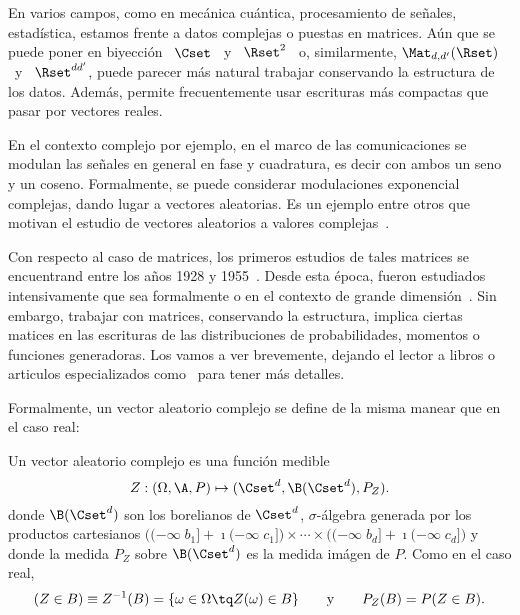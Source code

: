 \label{Sec:MP:VectoresComplejosMatricesAleatorias}

En  varios campos, como  en mec\'anica  cu\'antica, procesamiento  de se\~nales,
estad\'istica, estamos frente a datos complejas o puestas en matrices. A\'un que
se  puede poner en  biyecci\'on \  $\Cset$ \  y \  $\Rset^2$ \  o, similarmente,
$\Mat_{d,d'}(\Rset)$ \  y \ $\Rset^{d  d'}$, puede parecer m\'as  natural trabajar
conservando la  estructura de los  datos. Adem\'as, permite  frecuentemente usar
escrituras m\'as compactas que pasar por vectores reales.

En  el contexto  complejo por  ejemplo,  en el  marco de  las comunicaciones  se
modulan las  se\~nales en general  en fase y  cuadratura, es decir con  ambos un
seno  y un coseno.   Formalmente, se  puede considerar  modulaciones exponencial
complejas, dando  lugar a  vectores aleatorias.  Es  un ejemplo entre  otros que
motivan  el  estudio de  vectores  aleatorios  a valores  complejas~\cite{Lap17,
  SchSch03, EriKoi06, EriOll09, AmbGae96, Par18}.

Con respecto  al caso  de matrices,  los primeros estudios  de tales  matrices se
encuentrand entre  los a\~nos 1928 y 1955~\cite{Wis28,  NeuGol47, Wig55}.  Desde
esta  \'epoca, fueron  estudiados intensivamente  que  sea formalmente  o en  el
contexto de grande dimensi\'on~\cite{MarPas67, BouPas95}.  Sin embargo, trabajar
con  matrices, \ie  conservando la  estructura, implica  ciertas matices  en las
escrituras  de  las  distribuciones  de  probabilidades,  momentos  o  funciones
generadoras.  Los vamos a ver brevemente, dejando el lector a libros o articulos
especializados  como~\cite{AkeBai15,  GupNag99,  AndGui10,  LivNov18,  EdeRao05,
  Meh04, Car83, Daw81, MezSna08, TulVer04} para tener m\'as detalles.
%
%


\label{Ssec:MP:VAComplejos}

Formalmente, un vector aleatorio complejo se define de la misma manear que en el
caso real:
%
\begin{definicion}
\label{Def:MP:VectorAleatorioComplejo}
%
  Un vector aleatorio complejo es una funci\'on medible
  \[
  Z: (\Omega,\A,P) \mapsto (\Cset^d,\B(\Cset^d),P_Z).
  \]
  donde  $\B(\Cset^d)$  son  los  borelianos  de  $\Cset^d$,  $\sigma$-\'algebra
  generada  por los  productos  cartesianos  $\big( (-\infty  \;  b_1] +  \imath
  (-\infty \;  c_1] \big) \times \cdots  \times \big( (-\infty \;  b_d] + \imath
  (-\infty \;  c_d] \big)$  y donde  la medida $P_Z$  sobre $\B(\Cset^d)$  es la
  medida im\'agen de $P$. Como en el caso real,
  \[
  (Z \in  B) \equiv  Z^{-1}(B) =  \{ \omega \in  \Omega \tq  Z(\omega) \in  B \}
  \qquad \mbox{y} \qquad P_Z(B) = P(Z \in B).
  \]
\end{definicion}

